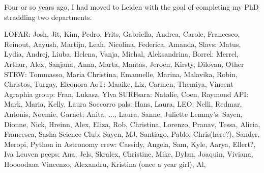 \cleardoublepage
{}
{}
\begin{thesisacknowledgements}

    Four or so years ago, I had moved to Leiden with the goal of completing my PhD straddling two departments. 



    LOFAR: Josh, Jit, Kim, Pedro, Frits, Gabriella, Andrea, Carole, Francesco, Reinout, Aayush, Martijn, Leah, Nicolina, Federica, Amanda, 
    Slavs: Matus, Lydia, Andrej, Liuba, Helena, Vanja, Michal, Aleksandrina, 
    Borrel: Merrel, Arthur, Alex, Sanjana, Anna, Marta, Mantas, Jeroen, Kirsty, Dilovan, 
    Other STRW: Tommasso, Maria Christina, Emanuelle, Marina, Malavika, Robin, Christos, Turgay, Eleonora
    AoT: Maaike, Liz, Carmen, Themiya, Vincent
    Agraphia group: Fran, Lukasz, Ylva
    SURFsara: Natalie, Coen, Raymond
    API: Mark, Maria, Kelly, Laura
    Soccorro pals: Hans, Laura, 
    LEO: Nelli, Redmar, Antonis, Noemie, Garnet; Anita, ..., Laura, Sanne, Juliette
    Lemmy's: Sayen, Dionne, Nick, Hreinn, Alex, Eliza, Rob, Christina, Lorenzo, Pranav, Tessa, Alicia, Francesca, Sasha
    Science Club: Sayen, MJ, Santiago, Pablo, Chris(here?), Sander, Meropi, 
    Python in Astronomy crew: Cassidy, Angela, Sam, Kyle, Aarya, Ellert?, Iva
    Leuven peeps: Ana, Jels, Skralex, Christine, Mike, Dylan, Joaquin, Viviana, Hoooodaaa
    Vincenzo, Alexandru, Kristina (once a year girl), Al, 


\end{thesisacknowledgements}
